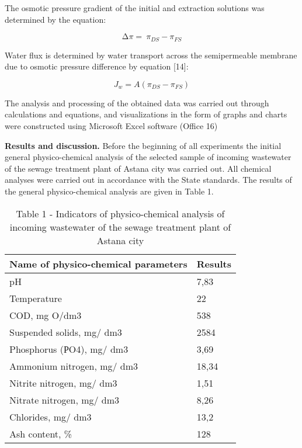\begin{multicols}{2}
The osmotic pressure gradient of the initial and extraction solutions
was determined by the equation:

\begin{equation}
\mathrm{\Delta}\pi = \ \pi_{DS} - \pi_{FS}
\end{equation}

Water flux is determined by water transport across the semipermeable
membrane due to osmotic pressure difference by equation {[}14{]}:

\begin{equation}
J_{w} = A(\pi_{DS} - \pi_{FS})
\end{equation}

The analysis and processing of the obtained data was carried out through
calculations and equations, and visualizations in the form of graphs and
charts were constructed using Microsoft Excel software (Office 16)

{\bfseries Results and discussion.} Before the beginning of all experiments
the initial general physico-chemical analysis of the selected sample of
incoming wastewater of the sewage treatment plant of Astana city was
carried out. All chemical analyses were carried out in accordance with
the State standards. The results of the general physico-chemical
analysis are given in Table 1.
\end{multicols}

\begin{table}[H]
\caption*{Table 1 - Indicators of physico-chemical analysis of incoming wastewater of the sewage treatment plant of Astana city}
\centering
\begin{tabular}{|l|l|}
\hline
Name of physico-chemical parameters & Results \\ \hline
pH                                  & 7,83    \\ \hline
Temperature                         & 22      \\ \hline
COD, mg O/dm3                       & 538     \\ \hline
Suspended solids, mg/ dm3           & 2584    \\ \hline
Phosphorus (РO4), mg/ dm3           & 3,69    \\ \hline
Ammonium nitrogen, mg/ dm3          & 18,34   \\ \hline
Nitrite nitrogen, mg/ dm3           & 1,51    \\ \hline
Nitrate nitrogen, mg/ dm3           & 8,26    \\ \hline
Chlorides, mg/ dm3                  & 13,2    \\ \hline
Ash content, \%                     & 128     \\ \hline
\end{tabular}
\end{table}

